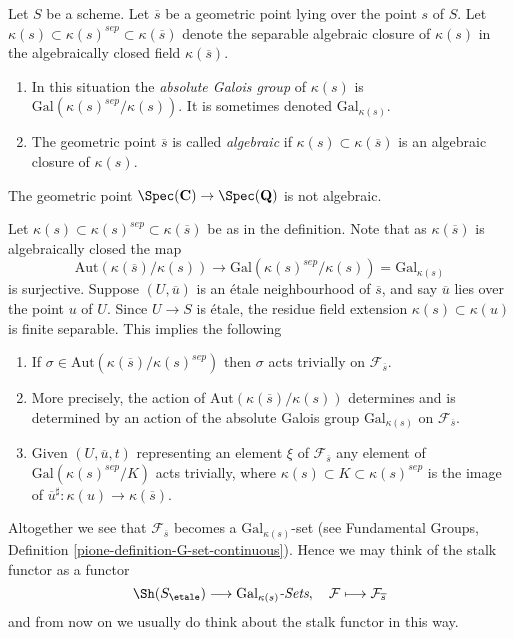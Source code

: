 \begin{definition}
\label{definition-algebraic-geometric-point}
Let $S$ be a scheme.
Let $\overline{s}$ be a geometric point lying over the point $s$ of $S$.
Let $\kappa(s) \subset \kappa(s)^{sep} \subset \kappa(\overline{s})$
denote the separable algebraic closure of $\kappa(s)$ in the algebraically
closed field $\kappa(\overline{s})$.
\begin{enumerate}
\item In this situation the {\it absolute Galois group} of $\kappa(s)$
is $\text{Gal}(\kappa(s)^{sep}/\kappa(s))$. It is sometimes denoted
$\text{Gal}_{\kappa(s)}$.
\item The geometric point $\overline{s}$ is called
{\it algebraic} if $\kappa(s) \subset \kappa(\overline{s})$ is
an algebraic closure of $\kappa(s)$.
\end{enumerate}
\end{definition}

\begin{example}
\label{example-stupid}
The geometric point
$\Spec(\mathbf{C}) \to \Spec(\mathbf{Q})$
is not algebraic.
\end{example}

\noindent
Let $\kappa(s) \subset \kappa(s)^{sep} \subset \kappa(\overline{s})$
be as in the definition. Note that as $\kappa(\overline{s})$ is algebraically
closed the map
$$
\text{Aut}(\kappa(\overline{s})/\kappa(s))
\longrightarrow
\text{Gal}(\kappa(s)^{sep}/\kappa(s)) = \text{Gal}_{\kappa(s)}
$$
is surjective. Suppose $(U, \overline{u})$ is an
\'etale neighbourhood of $\overline{s}$, and say $\overline{u}$ lies over
the point $u$ of $U$. Since $U \to S$ is \'etale, the residue field extension
$\kappa(s) \subset \kappa(u)$ is finite separable.
This implies the following
\begin{enumerate}
\item If $\sigma \in \text{Aut}(\kappa(\overline{s})/\kappa(s)^{sep})$
then $\sigma$ acts trivially on $\mathcal{F}_{\overline{s}}$.
\item More precisely, the action of
$\text{Aut}(\kappa(\overline{s})/\kappa(s))$
determines and is determined by an action of the absolute Galois group
$\text{Gal}_{\kappa(s)}$ on $\mathcal{F}_{\overline{s}}$.
\item Given $(U, \overline{u}, t)$ representing an element $\xi$ of
$\mathcal{F}_{\overline{s}}$ any element of
$\text{Gal}(\kappa(s)^{sep}/K)$ acts trivially, where
$\kappa(s) \subset K \subset \kappa(s)^{sep}$ is the image of
$\overline{u}^\sharp : \kappa(u) \to \kappa(\overline{s})$.
\end{enumerate}
Altogether we see that $\mathcal{F}_{\overline{s}}$ becomes a
$\text{Gal}_{\kappa(s)}$-set (see
Fundamental Groups, Definition \ref{pione-definition-G-set-continuous}).
Hence we may think of the stalk functor as a functor
$$
\Sh(S_\etale) \longrightarrow
\text{Gal}_{\kappa(s)}\textit{-Sets},
\quad
\mathcal{F} \longmapsto \mathcal{F}_{\overline{s}}
$$
and from now on we usually do think about the stalk functor in this way.

